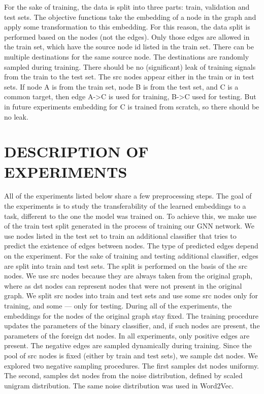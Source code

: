 \documentclass[a4paper,twoside]{article}
\begin{document}
For the sake of training, the data is split into three parts: train, validation and test sets. The objective functions take the embedding of a node in the graph and apply some transformation to this embedding. For this reason, the data split is performed based on the nodes (not the edges). Only those edges are allowed in the train set, which have the source node id listed in the train set. There can be multiple destinations for the same source node. The destinations are randomly sampled during training. 
There should be no (significant) leak of training signals from the train to the test set. The src nodes appear either in the train or in test sets. If node A is from the train set, node B is from the test set, and C is a common target, then edge A->C is used for training, B->C used for testing. But in future experiments embedding for C is trained from scratch, so there should be no leak.

\section{\uppercase{Description of experiments}}

All of the experiments listed below share a few preprocessing steps. The goal of the experiments is to study the transferability of the learned embeddings to a task, different to the one the model was trained on. To achieve this, we make use of the train test split generated in the process of training our GNN network. We use nodes listed in the test set to train an additional classifier that tries to predict the existence of edges between nodes. The type of predicted edges depend on the experiment. 
For the sake of training and testing additional classifier, edges are split into train and test sets. The split is performed on the basis of the src nodes. We use src nodes because they are always taken from the original graph, where as dst nodes can represent nodes that were not present in the original graph. We split src nodes into train and test sets and use some src nodes only for training, and some --- only for testing. During all of the experiments, the embeddings for the nodes of the original graph stay fixed. The training procedure updates the parameters of the binary classifier, and, if such nodes are present, the parameters of the foreign dst nodes. 
In all experiments, only positive edges are present. The negative edges are sampled dynamically during training. Since the pool of src nodes is fixed (either by train and test sets), we sample dst nodes. We explored two negative sampling procedures. The first samples dst nodes uniformy. The second, samples dst nodes from the noise distribution, defined by scaled unigram distribution. The same noise distribution was used in Word2Vec.
\end{document}
